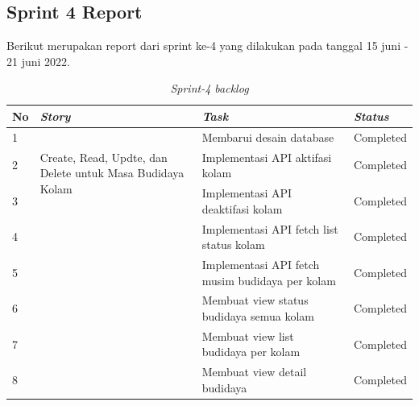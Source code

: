 
\subsection{Sprint 4 Report}
Berikut merupakan report dari sprint ke-4 yang dilakukan pada tanggal 15 juni - 21 juni 2022.

\begin{table}[H]
	\caption{\textit{Sprint-4 backlog}}
	\label{sprint4_backlog}
	\begin{tabular}{@{} |p{0.5cm}|p{5cm}|p{5cm}|p{2cm}| @{}}
		\hline
		\textbf{No} & \textbf{\textit{Story}} & \textbf{\textit{Task}} & \textbf{\textit{Status}} \\
		\hline
		1 & \multirow{3}{5cm}{Create, Read, Updte, dan Delete untuk Masa Budidaya Kolam} & Membarui desain database  & Completed\\
		\cline{1-1}\cline{3-4}
		2 & & Implementasi API aktifasi kolam & Completed\\
		\cline{1-1}\cline{3-4}
		3 & & Implementasi API deaktifasi kolam & Completed\\
		\cline{1-1}\cline{3-4}
		4 & & Implementasi API fetch list status kolam & Completed\\
		\cline{1-1}\cline{3-4}
		5 & & Implementasi API fetch musim budidaya per kolam & Completed\\
		\cline{1-1}\cline{3-4}
		6 & & Membuat view status budidaya semua kolam & Completed\\
		\cline{1-1}\cline{3-4}
		7 & & Membuat view list budidaya per kolam & Completed\\
		\cline{1-1}\cline{3-4}
		8 & & Membuat view detail budidaya & Completed\\
		\cline{1-1}\cline{3-4}
		\hline
	\end{tabular}
\end{table}

